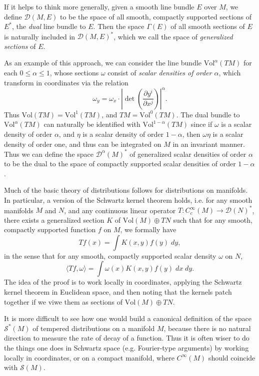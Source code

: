 \begin{remark} 
    If it helps to think more generally, given a smooth line bundle $E$ over $M$, we define $\mathcal{D}(M,E)$ to be the space of all smooth, compactly supported sections of $E^*$, the \emph{dual} line bundle to $E$. Then the space $\Gamma(E)$ of all smooth sections of $E$ is naturally included in $\mathcal{D}(M,E)^*$, which we call the space of \emph{generalized sections} of $E$.

    As an example of this approach, we can consider the line bundle $\text{Vol}^\alpha(TM)$ for each $0 \leq \alpha \leq 1$, whose sections $\omega$ consist of \emph{scalar densities of order $\alpha$}, which transform in coordinates via the relation
    \[ \omega_y = \omega_x \cdot \left| \det \left( \frac{\partial y^i}{\partial x^j} \right) \right|^\alpha. \]
    Thus $\text{Vol}(TM) = \text{Vol}^1(TM)$, and $TM = \text{Vol}^0(TM)$. The dual bundle to $\text{Vol}^\alpha(TM)$ can naturally be identified with $\text{Vol}^{1-\alpha}(TM)$ since if $\omega$ is a scalar density of order $\alpha$, and $\eta$ is a scalar density of order $1 - \alpha$, then $\omega \eta$ is a scalar density of order one, and thus can be integrated on $M$ in an invariant manner. Thus we can define the space $\mathcal{D}^\alpha(M)^*$ of generalized scalar densities of order $\alpha$ to be the dual to the space of compactly supported scalar densities of order $1 - \alpha$.
\end{remark}

Much of the basic theory of distributions follows for distributions on manifolds. In particular, a version of the Schwartz kernel theorem holds, i.e. for any smooth manifolds $M$ and $N$, and any continuous linear operator $T: C_c^\infty(M) \to \mathcal{D}(N)^*$, there exists a generalized section $K$ of $\text{Vol}(M) \oplus TN$ such that for any smooth, compactly supported function $f$ on $M$, we formally have
%
\[ Tf(x) = \int K(x,y) f(y)\; dy, \]
%
in the sense that for any smooth, compactly supported scalar density $\omega$ on $N$,
%
\[ \langle Tf, \omega \rangle = \int \omega(x) K(x,y) f(y)\; dx\; dy. \]
%
The idea of the proof is to work locally in coordinates, applying the Schwartz kernel theorem in Euclidean space, and then noting that the kernels patch together if we viwe them as sections of $\text{Vol}(M) \oplus TN$.

It is more difficult to see how one would build a canonical definition of the space $\mathcal{S}^*(M)$ of tempered distributions on a manifold $M$, because there is no natural direction to measure the rate of decay of a function. Thus it is often wiser to do the things one does in Schwartz space (e.g. Fourier-type arguments) by working locally in coordinates, or on a compact manifold, where $C^\infty(M)$ should coincide with $\mathcal{S}(M)$.

